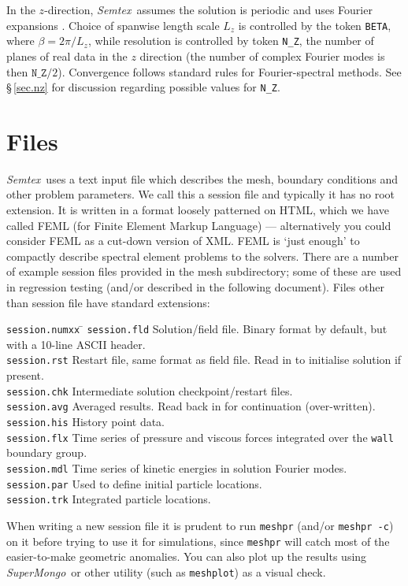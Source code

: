 \documentclass[11pt]{report}
\newcommand{\Semtex}{\emph{Semtex}} \newcommand{\Dog}{\emph{Dog}}
\newcommand{\SM}{\emph{SuperMongo}}
\begin{document}
In the $z$-direction, \Semtex\ assumes the solution is periodic and
uses Fourier expansions \citep[with a 2--3--5-prime-factor
  FFT from][]{temp92}.  Choice of spanwise length scale $L_z$ is controlled
by the token \verb|BETA|, where $\beta=2\pi/L_z$, while resolution is
controlled by token \verb|N_Z|, the number of planes of real data in
the $z$ direction (the number of complex Fourier modes is then
$\texttt{N\_Z}/2$).  Convergence follows standard rules for
Fourier-spectral methods.  See \S\,\ref{sec.nz} for discussion
regarding possible values for \verb|N_Z|.

\section{Files}

\Semtex\ uses a text input file which describes the mesh, boundary
conditions and other problem parameters.  We call this a session file
and typically it has no root extension.  It is written in a format
loosely patterned on HTML, which we have called FEML (for Finite
Element Markup Language) --- alternatively you could consider FEML as
a cut-down version of XML.  FEML is `just enough' to compactly
describe spectral element problems to the solvers.  There are a number
of example session files provided in the mesh subdirectory; some of
these are used in regression testing (and/or described in the
following document).  Files other than session file have standard
extensions:
\begin{tabbing}
\texttt{session.numxx} \= \kill
\texttt{session.fld}  \>
        Solution/field file.  Binary format by default,
        but with a 10-line ASCII header.\\
\texttt{session.rst}  \>
        Restart file, same format as field file.
        Read in to initialise solution if present.\\
\texttt{session.chk}  \>
        Intermediate solution checkpoint/restart files.\\
\texttt{session.avg} \> Averaged results. Read back in for
        continuation (over-written).\\
\texttt{session.his} \> History point data.\\
\texttt{session.flx} \> Time series of pressure and viscous forces
        integrated over the \texttt{wall} boundary group.\\
\texttt{session.mdl} \> Time series of kinetic energies
        in solution Fourier modes.\\
\texttt{session.par} \> Used to define initial particle locations.\\
\texttt{session.trk} \> Integrated particle locations.\\
\end{tabbing}
When writing a new session file it is prudent to run \texttt{meshpr}
(and/or \texttt{meshpr -c}) on it before trying to use it for
simulations, since \texttt{meshpr} will catch most of the
easier-to-make geometric anomalies.  You can also plot up the results
using \SM\ or other utility (such as \verb|meshplot|) as a visual
check.
\end{document}
